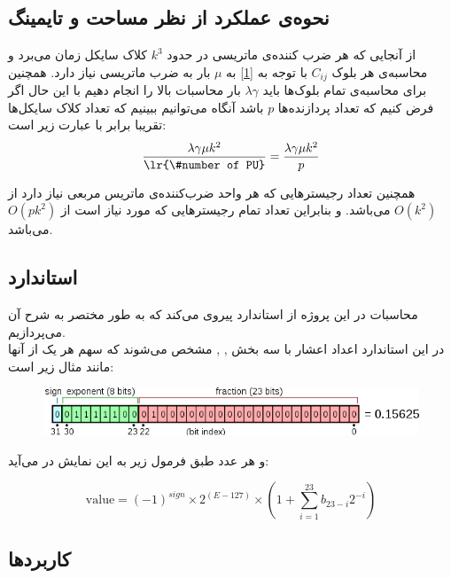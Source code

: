\documentclass[12pt,onecolumn,a4paper,fleqn]{article}
\begin{document}
\subsection{نحوه‌ی عملکرد از نظر مساحت و تایمینگ}
از آنجایی که هر ضرب کننده‌ی ماتریسی در حدود
 $k^3$
 کلاک سایکل زمان می‌برد و محاسبه‌ی هر بلوک $C_{ij}$ با توجه به
 \autoref{1}
به $\mu$ بار به ضرب ماتریسی نیاز دارد. همچنین برای محاسبه‌ی تمام بلوک‌ها باید $\lambda\gamma$ بار محاسبات بالا را انجام دهیم با این حال اگر فرض کنیم که تعداد پردازنده‌ها $p$ باشد آنگاه می‌توانیم ببینیم که تعداد کلاک‌ سایکل‌ها تقریبا برابر با عبارت زیر است:
\begin{equation}
	\dfrac{\lambda\gamma\mu k^2}{\text{\lr{\#number of PU}}} = 	\dfrac{\lambda\gamma\mu k^2}{p}
\end{equation}

همچنین تعداد رجیستر‌هایی که هر واحد ضرب‌کننده‌ی ماتریس مربعی نیاز دارد از $O(k^2)$ می‌باشد. و بنابراین تعداد تمام رجیستر‌هایی که مورد نیاز است از $O(pk^2)$ می‌باشد.

	\pagebreak

\subsection{استاندارد‌ }
محاسبات در این پروژه از استاندارد
 پیروی می‌کند که به طور مختصر به شرح آن می‌پردازیم. \\
 در این استاندارد اعداد اعشار با سه بخش  ,  ,  مشخص می‌شوند که سهم هر یک از آنها مانند مثال زیر است:
 
\begin{figure}[h]
	\centering
	\includegraphics[width=0.8\linewidth]{source/float_example.png}
\end{figure}

و هر عدد طبق فرمول زیر به این نمایش در می‌آید:

\begin{equation}
\text{value} = (-1)^{sign} \times 2^{(E-127)} \times (1 + \sum_{i=1}^{23}b_{23-i}2^{-i})
\end{equation}

\subsection{کاربرد‌ها}
 
\end{document}
